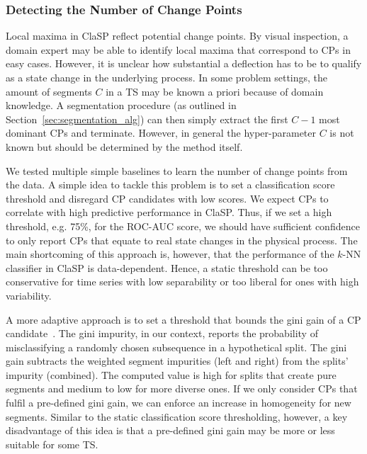 \documentclass[pdflatex,sn-basic]{sn-jnl}
\begin{document}
\subsubsection{Detecting the Number of Change Points} \label{sec:cp-candidate-val}

Local maxima in ClaSP reflect potential change points. By visual inspection, a domain expert may be able to identify local maxima that correspond to CPs in easy cases. However, it is unclear how substantial a deflection has to be to qualify as a state change in the underlying process. In some problem settings, the amount of segments $C$ in a TS may be known a priori because of domain knowledge. A segmentation procedure (as outlined in Section~\ref{sec:segmentation_alg}) can then simply extract the first $C-1$ most dominant CPs and terminate. However, in general the hyper-parameter $C$ is not known but should be determined by the method itself.

We tested multiple simple baselines to learn the number of change points from the data. A simple idea to tackle this problem is to set a classification score threshold and disregard CP candidates with low scores. We expect CPs to correlate with high predictive performance in ClaSP. Thus, if we set a high threshold, e.g. 75\%, for the ROC-AUC score, we should have sufficient confidence to only report CPs that equate to real state changes in the physical process. The main shortcoming of this approach is, however, that the performance of the $k$-NN classifier in ClaSP is data-dependent. Hence, a static threshold can be too conservative for time series with low separability or too liberal for ones with high variability. 

A more adaptive approach is to set a threshold that bounds the gini gain of a CP candidate~\citep{Breiman2004TechnicalNS}. The gini impurity, in our context, reports the probability of misclassifying a randomly chosen subsequence in a hypothetical split. The gini gain subtracts the weighted segment impurities (left and right) from the splits' impurity (combined). The computed value is high for splits that create pure segments and medium to low for more diverse ones. If we only consider CPs that fulfil a pre-defined gini gain, we can enforce an increase in homogeneity for new segments. Similar to the static classification score thresholding, however, a key disadvantage of this idea is that a pre-defined gini gain may be more or less suitable for some TS.
\end{document}
